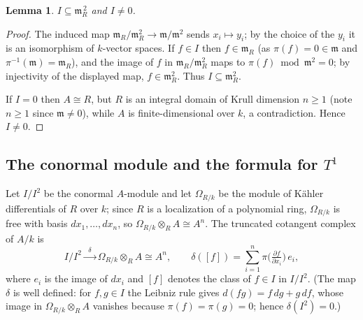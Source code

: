 \documentclass{amsart}
\newtheorem{lemma}{Lemma}
\begin{document}
\begin{lemma}\label{lem:I-in-msq}
$I\subseteq \mathfrak m_R^{\,2}$ and $I\neq 0$.
\end{lemma}

\begin{proof}
The induced map $\mathfrak m_R/\mathfrak m_R^2\to \mathfrak m/\mathfrak m^2$ sends
$x_i\mapsto y_i$; by the choice of the $y_i$ it is an isomorphism of
$k$-vector spaces. If $f\in I$ then $f\in\mathfrak m_R$ (as $\pi(f)=0\in\mathfrak m$
and $\pi^{-1}(\mathfrak m)=\mathfrak m_R$), and the image of $f$ in
$\mathfrak m_R/\mathfrak m_R^2$ maps to $\pi(f)\bmod\mathfrak m^2=0$; by injectivity
of the displayed map, $f\in\mathfrak m_R^2$. Thus $I\subseteq\mathfrak m_R^2$.

If $I=0$ then $A\cong R$, but $R$ is an integral domain of Krull dimension $n\ge 1$
(note $n\ge 1$ since $\mathfrak m\neq 0$), while $A$ is finite-dimensional over $k$,
a contradiction. Hence $I\neq 0$.
\end{proof}

\subsection{The conormal module and the formula for $T^1$}
Let $I/I^2$ be the conormal $A$-module and let $\Omega_{R/k}$ be the module of
K\"ahler differentials of $R$ over $k$; since $R$ is a localization of a polynomial
ring, $\Omega_{R/k}$ is free with basis $dx_1,\dots,dx_n$, so
$\Omega_{R/k}\otimes_R A\cong A^n$. The truncated cotangent complex of $A/k$ is
\begin{equation}\label{eq:cotangent}
I/I^2 \xrightarrow{\;\;\delta\;\;} \Omega_{R/k}\otimes_R A\cong A^n,
\qquad \delta([f])=\sum_{i=1}^n \pi\!\Big(\tfrac{\partial f}{\partial x_i}\Big)\,
e_i ,
\end{equation}
where $e_i$ is the image of $dx_i$ and $[f]$ denotes the class of $f\in I$ in
$I/I^2$. (The map $\delta$ is well defined: for $f,g\in I$ the Leibniz rule gives
$d(fg)=f\,dg+g\,df$, whose image in $\Omega_{R/k}\otimes_R A$ vanishes because
$\pi(f)=\pi(g)=0$; hence $\delta(I^2)=0$.)
\end{document}
